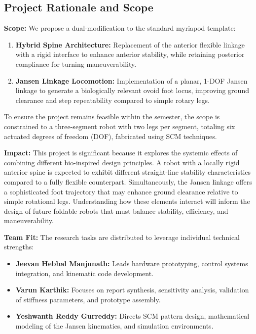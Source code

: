 \documentclass[11pt, letterpaper]{article}
\begin{document}
\subsection{Project Rationale and Scope}
\textbf{Scope:} We propose a dual-modification to the standard myriapod template:
\begin{enumerate}
    \item \textbf{Hybrid Spine Architecture:} Replacement of the anterior flexible linkage with a rigid interface to enhance anterior stability, while retaining posterior compliance for turning maneuverability.
    \item \textbf{Jansen Linkage Locomotion:} Implementation of a planar, 1-DOF Jansen linkage to generate a biologically relevant ovoid foot locus, improving ground clearance and step repeatability compared to simple rotary legs.
\end{enumerate}
To ensure the project remains feasible within the semester, the scope is constrained to a three-segment robot with two legs per segment, totaling six actuated degrees of freedom (DOF), fabricated using SCM techniques.

\textbf{Impact:} This project is significant because it explores the systemic effects of combining different bio-inspired design principles. A robot with a locally rigid anterior spine is expected to exhibit different straight-line stability characteristics compared to a fully flexible counterpart. Simultaneously, the Jansen linkage offers a sophisticated foot trajectory that may enhance ground clearance relative to simple rotational legs. Understanding how these elements interact will inform the design of future foldable robots that must balance stability, efficiency, and maneuverability.

\textbf{Team Fit:} The research tasks are distributed to leverage individual technical strengths:
\begin{itemize}
    \item \textbf{Jeevan Hebbal Manjunath:} Leads hardware prototyping, control systems integration, and kinematic code development.
    \item \textbf{Varun Karthik:} Focuses on report synthesis, sensitivity analysis, validation of stiffness parameters, and prototype assembly.
    \item \textbf{Yeshwanth Reddy Gurreddy:} Directs SCM pattern design, mathematical modeling of the Jansen kinematics, and simulation environments.
\end{itemize}
\end{document}
